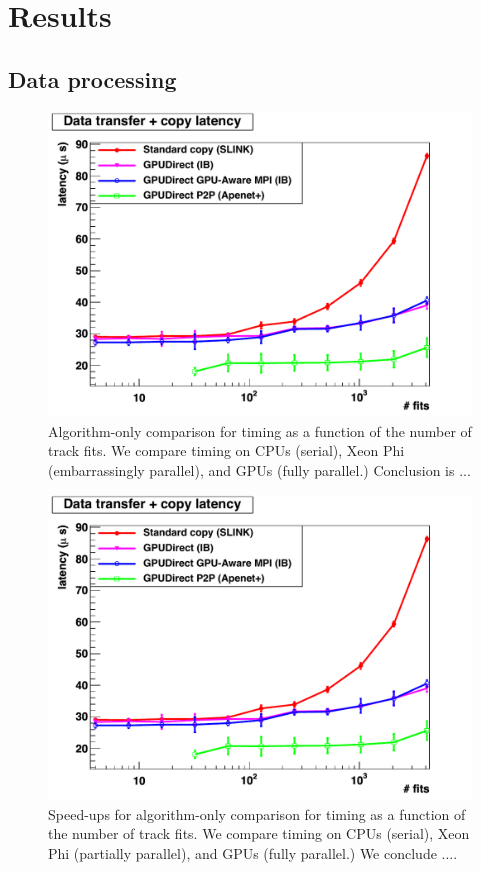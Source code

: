 \documentclass[letterpaper]{jpconf}
\begin{document}
\section{Results}
\subsection{Data processing}
\begin{figure}[tbp]
  \centering
  \includegraphics[width=0.9\linewidth]{../../2012/figures/DT_MC_SLINK_IB_APE_low}

  \caption{Algorithm-only comparison for timing as a function of the
    number of track fits. We compare timing on CPUs (serial), Xeon Phi
    (embarrassingly parallel), and GPUs (fully parallel.) Conclusion
    is ...}
  \label{fig:algo_only_timing}
\end{figure}
\begin{figure}[tbp]
  \centering
  \includegraphics[width=0.9\linewidth]{../../2012/figures/DT_MC_SLINK_IB_APE_low}

  \caption{Speed-ups for algorithm-only comparison for timing as a
    function of the number of track fits. We compare timing on CPUs
    (serial), Xeon Phi (partially parallel), and GPUs (fully
    parallel.) We conclude ....}
  \label{fig:algo_only_speedup}
\end{figure}
\end{document}
